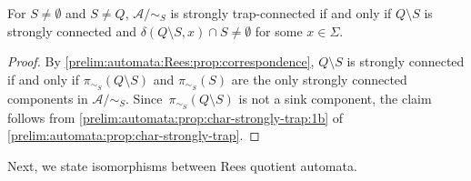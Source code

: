\begin{corollary}  \label{prelim:fact:factor-strongly-trap}
	For $S \ne \emptyset$ and $S\ne Q$,
	$\mathcal A / {\sim_S}$ is strongly trap-connected 
	if and only if $Q\setminus S$ is strongly connected
	and $\delta(Q \setminus S, x) \cap S \ne \emptyset$ for some $x \in \Sigma$.
\end{corollary}
\begin{proof}
	By \cref{prelim:automata:Rees:prop:correspondence},
	$Q \setminus S$ is strongly connected
	if and only if $\pi_{\sim_S}(Q \setminus S)$
	and $\pi_{\sim_S}(S)$ are the only strongly connected components in $\mathcal A / {\sim_S}$.
	Since~$\pi_{\sim_S}(Q \setminus S)$
	is not a sink component,
	the claim follows from \cref{prelim:automata:prop:char-strongly-trap:1b} of \cref{prelim:automata:prop:char-strongly-trap}.		
\end{proof}

Next, we state isomorphisms between Rees quotient automata.

